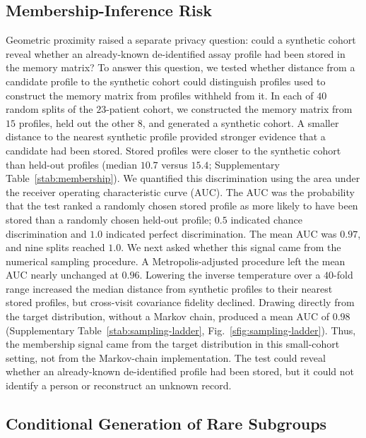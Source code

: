 \subsection{Membership-Inference Risk}

Geometric proximity raised a separate privacy question: could a synthetic cohort reveal
whether an already-known de-identified assay profile had been stored in the memory matrix?
To answer this question, we tested whether distance from a candidate profile to the synthetic
cohort could distinguish profiles used to construct the memory matrix from profiles withheld
from it. In each of $40$ random splits of the $23$-patient cohort, we constructed the memory
matrix from $15$ profiles, held out the other $8$, and generated a synthetic cohort. A smaller
distance to the nearest synthetic profile provided stronger evidence that a candidate had
been stored. Stored profiles were closer to the synthetic cohort than held-out profiles
(median $10.7$ versus $15.4$; Supplementary Table~\ref{stab:membership}). We quantified this
discrimination using the area under the receiver operating characteristic curve (AUC). The
AUC was the probability that the test ranked a randomly chosen stored profile as more likely
to have been stored than a randomly chosen held-out profile; $0.5$ indicated chance
discrimination and $1.0$ indicated perfect discrimination. The mean AUC was $0.97$, and nine
splits reached $1.0$. We next asked whether this signal came from the numerical sampling
procedure. A Metropolis-adjusted procedure left the mean AUC nearly unchanged at $0.96$.
Lowering the inverse temperature over a $40$-fold range increased the median distance from
synthetic profiles to their nearest stored profiles, but cross-visit covariance fidelity
declined. Drawing directly from the target distribution, without a Markov chain, produced a
mean AUC of $0.98$ (Supplementary Table~\ref{stab:sampling-ladder},
Fig.~\ref{sfig:sampling-ladder}). Thus, the membership signal came from the target
distribution in this small-cohort setting, not from the Markov-chain implementation. The test
could reveal whether an already-known de-identified profile had been stored, but it could not
identify a person or reconstruct an unknown record.

\subsection{Conditional Generation of Rare Subgroups}
\label{sec:results-l3}


